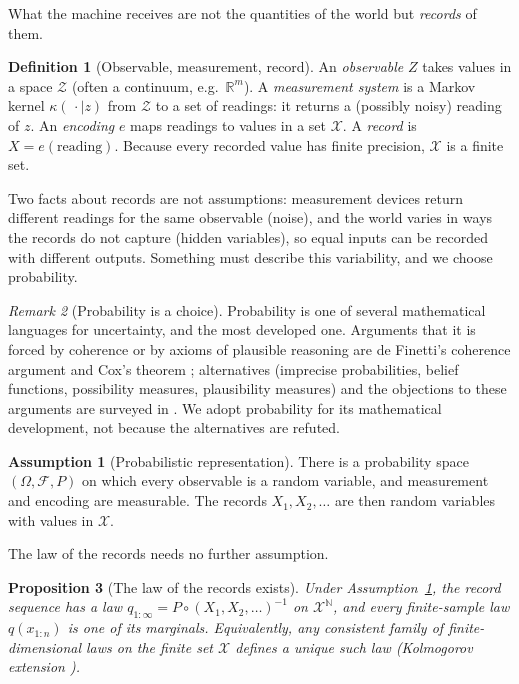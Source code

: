 \documentclass[11pt]{article}
\theoremstyle{definition}
\newtheorem{definition}{Definition}[section]
\newtheorem{assumption}{Assumption}
\theoremstyle{plain}
\newtheorem{proposition}[definition]{Proposition}
\theoremstyle{remark}
\newtheorem{remark}[definition]{Remark}
\newcommand{\X}{\mathcal{X}}
\newcommand{\Z}{\mathcal{Z}}
\newcommand{\R}{\mathbb{R}}
\begin{document}
What the machine receives are not the quantities of the world but
\emph{records} of them.

\begin{definition}[Observable, measurement, record]
An \emph{observable} $Z$ takes values in a space $\Z$ (often a
continuum, e.g.\ $\R^m$). A \emph{measurement system} is a Markov kernel
$\kappa(\,\cdot \mid z)$ from $\Z$ to a set of readings: it returns a
(possibly noisy) reading of $z$. An \emph{encoding} $e$ maps readings to
values in a set $\X$. A \emph{record} is $X = e(\text{reading})$. Because
every recorded value has finite precision, $\X$ is a finite set.
\end{definition}

Two facts about records are not assumptions: measurement devices
return different readings for the same observable (noise), and the
world varies in ways the records do not capture (hidden variables), so
equal inputs can be recorded with different outputs. Something must
describe this variability, and we choose probability.

\begin{remark}[Probability is a choice]
Probability is one of several mathematical languages for uncertainty,
and the most developed one. Arguments that it is forced by
coherence or by axioms of plausible reasoning are de Finetti's
coherence argument \cite{kadane2011} and Cox's theorem
\cite{vanhorn2003}; alternatives (imprecise probabilities, belief
functions, possibility measures, plausibility measures) and the
objections to these arguments are surveyed in \cite{halpern2017}. We
adopt probability for its mathematical development, not because the
alternatives are refuted.
\end{remark}

\begin{assumption}[Probabilistic representation]\label{as:prob}
There is a probability space $(\Omega,\mathcal{F},P)$ on which every
observable is a random variable, and measurement and encoding are
measurable. The records $X_1, X_2, \dots$ are then random variables
with values in $\X$.
\end{assumption}

The law of the records needs no further assumption.

\begin{proposition}[The law of the records exists]
Under Assumption~\ref{as:prob}, the record sequence has a law
$q_{1:\infty} = P\circ(X_1,X_2,\dots)^{-1}$ on $\X^{\mathbb N}$, and
every finite-sample law $q(x_{1:n})$ is one of its marginals.
Equivalently, any consistent family of finite-dimensional laws on the
finite set $\X$ defines a unique such law (Kolmogorov extension
\cite{kallenberg2002}).
\end{proposition}
\end{document}

